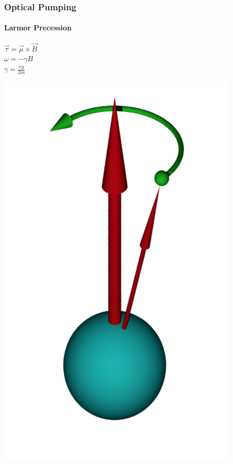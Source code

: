 \documentclass{beamer}
\begin{document}
\begin{frame}
  \frametitle{Optical Pumping}
  \framesubtitle{Larmor Precession}
	  \begin{minipage}{0.4\textwidth}
		\vspace{-5cm}
	  \begin{center}
		 $\vec \tau = \vec \mu \times \vec B $\\
	\vspace{1cm}
	   $\omega = -\gamma B$\\
	\vspace{1cm}
	   $ \gamma = \frac{eg}{2m}$
	\end{center}
  \end{minipage}
  \hfill
  \begin{minipage}[b]{0.4\textwidth}
  \includegraphics[scale = .4]{Images/larmorprecession.png}
  \end{minipage}
\end{frame}
\end{document}
